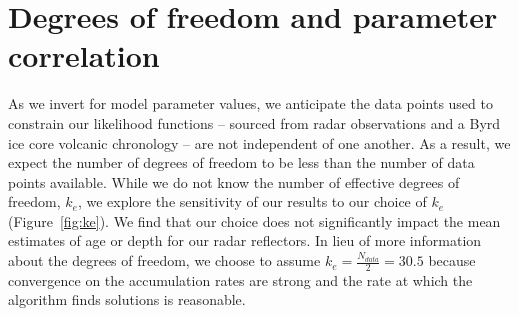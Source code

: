 










\section{Degrees of freedom and parameter correlation}\label{sec:ke}

As we invert for model parameter values, we anticipate the data points used to constrain our likelihood functions -- sourced from radar observations and a Byrd ice core volcanic chronology -- are not independent of one another. As a result, we expect the number of degrees of freedom to be less than the number of data points available. While we do not know the number of effective degrees of freedom, $k_e$, we explore the sensitivity of our results to our choice of $k_e$ (Figure~\ref{fig:ke}). We find that our choice does not significantly impact the mean estimates of age or depth for our radar reflectors. In lieu of more information about the degrees of freedom, we choose to assume $k_e = \frac{N_{data}}{2} = 30.5$ because convergence on the accumulation rates are strong and the rate at which the algorithm finds solutions is reasonable. 

